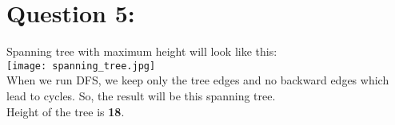 \documentclass{article}
\begin{document}
\section*{Question 5:}
Spanning tree with maximum height will look like this:\\
\texttt{[image: spanning\_tree.jpg]}\\
When we run DFS, we keep only the tree edges and no backward edges which lead to cycles. So, the result will be this spanning tree.\\
Height of the tree is \textbf{18}.
\end{document}
